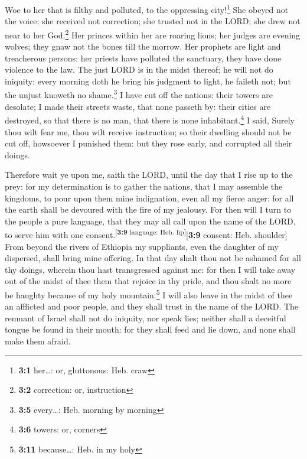  Woe to her that is filthy and polluted, to the oppressing
city!\footnote{\textbf{3:1} her\ldots: or, gluttonous: Heb. craw}
 She obeyed not the voice; she received not correction;
she trusted not in the LORD; she drew not near to her God.\footnote{\textbf{3:2}
  correction: or, instruction}  Her princes within her are
roaring lions; her judges are evening wolves; they gnaw not the bones
till the morrow.  Her prophets are light and treacherous
persons: her priests have polluted the sanctuary, they have done
violence to the law.  The just LORD is in the midst
thereof; he will not do iniquity: every morning doth he bring his
judgment to light, he faileth not; but the unjust knoweth no
shame.\footnote{\textbf{3:5} every\ldots: Heb. morning by morning}
 I have cut off the nations: their towers are desolate; I
made their streets waste, that none passeth by: their cities are
destroyed, so that there is no man, that there is none
inhabitant.\footnote{\textbf{3:6} towers: or, corners}  I
said, Surely thou wilt fear me, thou wilt receive instruction; so their
dwelling should not be cut off, howsoever I punished them: but they rose
early, and corrupted all their doings.

 Therefore wait ye upon me, saith the LORD, until the day
that I rise up to the prey: for my determination is to gather the
nations, that I may assemble the kingdoms, to pour upon them mine
indignation, even all my fierce anger: for all the earth shall be
devoured with the fire of my jealousy.  For then will I
turn to the people a pure language, that they may all call upon the name
of the LORD, to serve him with one
consent.\textsuperscript{{[}\textbf{3:9} language: Heb.
lip{]}}{[}\textbf{3:9} consent: Heb. shoulder{]}  From
beyond the rivers of Ethiopia my suppliants, even the daughter of my
dispersed, shall bring mine offering.  In that day shalt
thou not be ashamed for all thy doings, wherein thou hast transgressed
against me: for then I will take away out of the midst of thee them that
rejoice in thy pride, and thou shalt no more be haughty because of my
holy mountain.\footnote{\textbf{3:11} because\ldots: Heb. in my holy}
 I will also leave in the midst of thee an afflicted and
poor people, and they shall trust in the name of the LORD.
 The remnant of Israel shall not do iniquity, nor speak
lies; neither shall a deceitful tongue be found in their mouth: for they
shall feed and lie down, and none shall make them afraid.

